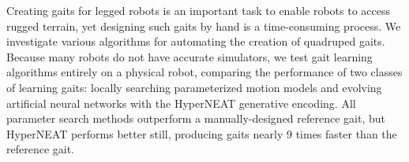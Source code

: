 Creating gaits for legged robots is an important task to enable robots
to access rugged terrain, yet designing such gaits by hand is a
time-consuming process. We investigate
various algorithms for automating the creation of quadruped
gaits. Because many robots do not have accurate simulators, we test
gait learning algorithms entirely on a physical robot, comparing the
performance of two classes of learning gaits: locally searching
parameterized motion models and evolving artificial neural networks
with the HyperNEAT generative encoding.  All parameter search methods
outperform a manually-designed reference gait, but HyperNEAT performs
better still, producing gaits nearly 9 times faster than the reference
gait.



